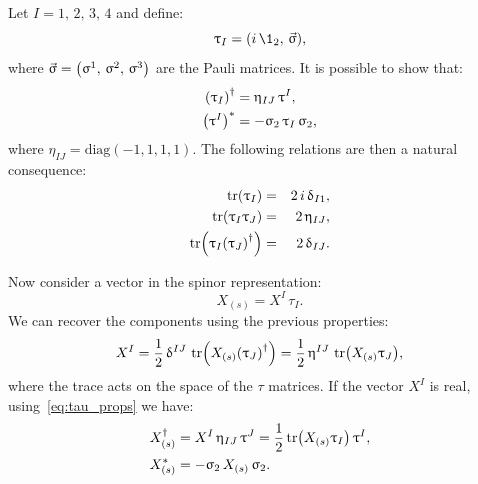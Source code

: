 Let $I = 1,\, 2,\, 3,\, 4$ and define:
\begin{equation}
  \tau_I = \qty( i\, \1_2,\, \vec{\sigma} ),
\end{equation}
where $\vec{\upsigma} = \qty( \upsigma^1,\, \upsigma^2,\, \upsigma^3 )$ are the Pauli matrices.
It is possible to show that:
\begin{equation}
  \begin{split}
    \qty( \uptau_I )^{\dagger}
    & =
    \upeta_{IJ}\, {\uptau}^I,
    \\
    \qty( \uptau^I )^*
    & =
    -\upsigma_2\, \uptau_I\, \upsigma_2,
  \end{split}
  \label{eq:tau_props}
\end{equation}
where $\eta_{IJ} = \mathrm{diag}(-1,1,1,1)$.
The following relations are then a natural consequence:
\begin{eqnarray}
  \tr(\uptau_I)
  & = &
  2\, i\, \updelta_{I1},
  \\
  \tr(\uptau_I \uptau_J)
  & = &
  2\, \upeta_{IJ},
  \\
  \tr(\uptau_I \qty( \uptau_J )^{\dagger})
  & = &
  2\, \updelta_{IJ}.
\end{eqnarray}

Now consider a vector in the spinor representation:
\begin{equation}
  X_{(s)} = X^I\, \tau_I.
\end{equation}
We can recover the components using the previous properties:
\begin{equation}
  X^I
  =
  \frac{1}{2}\, \updelta^{IJ}\,
  \tr(X_{(s)} \qty( \uptau_J )^{\dagger})
  =
  \frac{1}{2}\, \upeta^{IJ}\, \tr(X_{(s)} \uptau_J),
\end{equation}
where the trace acts on the space of the $\tau$ matrices.
If the vector $X^I$ is real, using~\eqref{eq:tau_props} we have:
\begin{equation}
  \begin{split}
    X_{(s)}^{\dagger}
    & =
    X^I\, \upeta_{IJ}\, \uptau^J
    =
    \frac{1}{2} \tr(X_{(s)} \uptau_I)\, \uptau^I,
    \\
    X_{(s)}^*
    & =
    - \upsigma_2\, X_{(s)}\, \upsigma_2.
  \end{split}
  \label{eq:X_dagger}
\end{equation}

